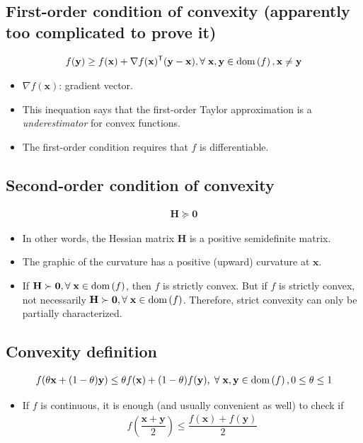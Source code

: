 \documentclass{article}
\newcommand{\dom}[1]{\ensuremath{\textnormal{dom}\left(#1\right)}} %
\begin{document}
\subsection{First-order condition of convexity (apparently too complicated to prove it)}
\begin{align}
    f(\mathbf{y}) \geq f(\mathbf{x}) + \nabla f (\mathbf{x})^\mathsf{T} (\mathbf{y} - \mathbf{x}),\forall\;\mathbf{x},\mathbf{y} \in \dom{f}, \mathbf{x}\neq\mathbf{y}
\end{align}
\begin{itemize}
    \item \(\nabla f (\mathbf{x})\): gradient vector.
    \item This inequation says that the first-order Taylor approximation is a \emph{underestimator} for convex functions.
    \item The first-order condition requires that \(f\) is differentiable.
\end{itemize}
\subsection{Second-order condition of convexity}
\begin{align}
    \mathbf{H}\succeq \mathbf{0}
\end{align}
\begin{itemize}
    \item In other words, the Hessian matrix \(\mathbf{H}\) is a positive semidefinite matrix.
    \item The graphic of the curvature has a positive (upward) curvature at \(\mathbf{x}\).
    \item If \(\mathbf{H}\succ\mathbf{0}, \forall\; \mathbf{x} \in \dom{f}\), then \(f\) is strictly convex. But if \(f\) is strictly convex, not necessarily \(\mathbf{H}\succ\mathbf{0},\forall\; \mathbf{x} \in \dom{f}\). Therefore, strict convexity can only be partially characterized.
\end{itemize}
\subsection{Convexity definition}
\begin{align}
    f(\theta\mathbf{x}+(1-\theta)\mathbf{y}) \leq \theta f(\mathbf{x}) + (1-\theta)f(\mathbf{y}),\;\forall\; \mathbf{x}, \mathbf{y} \in \dom{f}, 0\leq\theta\leq 1
\end{align}
\begin{itemize}
	\item If \(f\) is continuous, it is enough (and usually convenient as well) to check if
    \begin{align}
        f\left( \dfrac{\mathbf{x}+\mathbf{y}}{2} \right) \leq \dfrac{f(\mathbf{x}) + f(\mathbf{y})}{2}
    \end{align}
\end{itemize}
\end{document}
